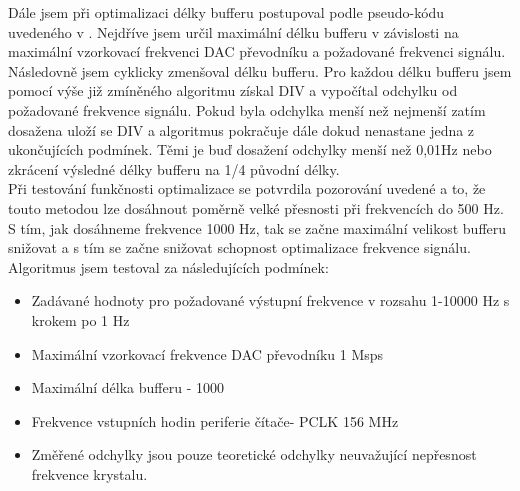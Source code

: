  Dále jsem při optimalizaci délky bufferu postupoval podle pseudo-kódu uvedeného v \cite{SDI_Hladik}. Nejdříve jsem určil maximální délku bufferu v závislosti na maximální vzorkovací frekvenci DAC převodníku a požadované frekvenci signálu. Následovně jsem cyklicky zmenšoval délku bufferu. Pro každou délku bufferu jsem pomocí výše již zmíněného algoritmu získal DIV a vypočítal odchylku od požadované frekvence signálu. Pokud byla odchylka menší než nejmenší zatím dosažena uloží se DIV a algoritmus pokračuje dále dokud nenastane jedna z ukončujících podmínek. Těmi je buď dosažení odchylky menší než 0,01Hz nebo zkrácení výsledné délky bufferu na 1/4 původní délky.\\
 
 Při testování funkčnosti optimalizace se potvrdila pozorování uvedené \cite{SDI_Hladik} a to, že touto metodou lze dosáhnout poměrně velké přesnosti při frekvencích do 500 Hz. S tím, jak dosáhneme frekvence 1000 Hz, tak se začne maximální velikost bufferu snižovat a  s tím se začne snižovat schopnost optimalizace frekvence signálu. Algoritmus jsem testoval za následujících podmínek:
 \begin{itemize}
 	\item Zadávané hodnoty pro požadované výstupní frekvence v rozsahu 1-10000 Hz s krokem po 1 Hz
 	\item Maximální vzorkovací frekvence DAC převodníku 1 Msps
 	\item Maximální délka bufferu - 1000
 	\item Frekvence vstupních hodin periferie čítače- PCLK 156 MHz
 	\item Změřené odchylky jsou pouze teoretické odchylky neuvažující nepřesnost frekvence krystalu.
 \end{itemize}
 

